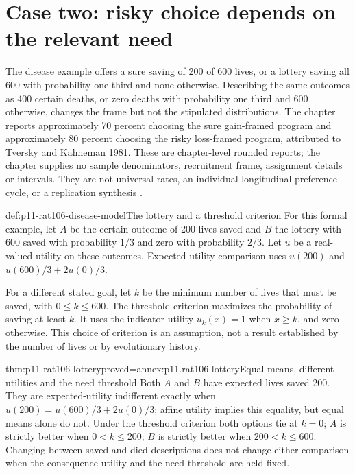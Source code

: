\section{Case two: risky choice depends on the relevant need}
\label{sec:p11-rat106-risk}

The disease example offers a sure saving of 200 of 600 lives, or a
lottery saving all 600 with probability one third and none otherwise.
Describing the same outcomes as 400 certain deaths, or zero deaths
with probability one third and 600 otherwise, changes the frame but
not the stipulated distributions. The chapter reports approximately
70 percent choosing the sure gain-framed program and approximately
80 percent choosing the risky loss-framed program, attributed to
Tversky and Kahneman 1981. These are chapter-level rounded reports;
the chapter supplies no sample denominators, recruitment frame,
assignment details or intervals. They are not universal rates, an
individual longitudinal preference cycle, or a replication synthesis
\cite[p.~636]{CosmidesTooby2021Adaptationism}.

\begin{hbdefinition}{def:p11-rat106-disease-model}{The lottery and a threshold criterion}
For this formal example, let \(A\) be the certain outcome of 200 lives
saved and \(B\) the lottery with 600 saved with probability \(1/3\)
and zero with probability \(2/3\). Let \(u\) be a real-valued utility
on these outcomes. Expected-utility comparison uses \(u(200)\)
and \(u(600)/3+2u(0)/3\).

For a different stated goal, let \(k\) be the minimum number of lives
that must be saved, with \(0\leq k\leq600\). The threshold criterion
maximizes the probability of saving at least \(k\). It uses the
indicator utility \(u_k(x)=1\) when \(x\geq k\), and zero otherwise.
This choice of criterion is an assumption, not a result established
by the number of lives or by evolutionary history.
\end{hbdefinition}

\begin{hbtheorem}{thm:p11-rat106-lottery}{proved=annex:p11.rat106-lottery}{Equal means, different utilities and the need threshold}
Both \(A\) and \(B\) have expected lives saved 200. They are
expected-utility indifferent exactly when
\(u(200)=u(600)/3+2u(0)/3\); affine utility implies this equality,
but equal means alone do not. Under the threshold criterion both
options tie at \(k=0\); \(A\) is strictly better when
\(0<k\leq200\); \(B\) is strictly better when
\(200<k\leq600\). Changing between saved and died descriptions
does not change either comparison when the consequence utility and
the need threshold are held fixed.
\end{hbtheorem}


